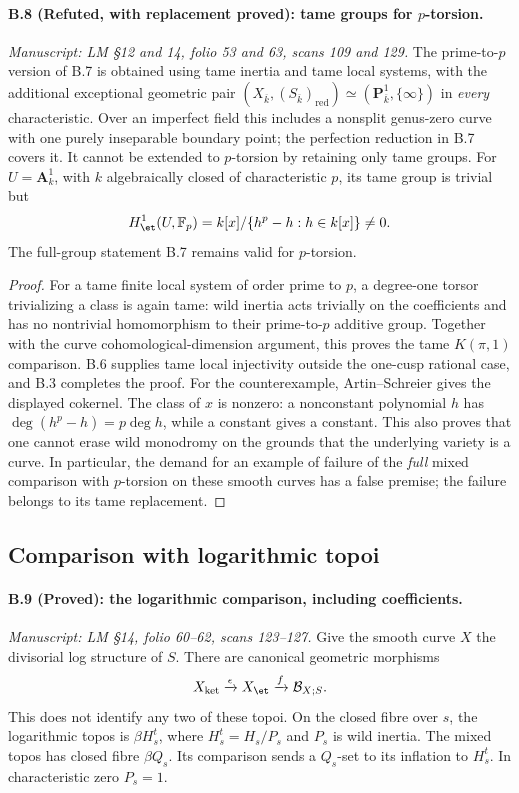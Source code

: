 \paragraph{B.8 (Refuted, with replacement proved): tame groups for $p$-torsion.}\label{B8}
\textit{Manuscript: LM \S12 and 14, folio 53 and 63, scans 109 and 129.}
The prime-to-$p$ version of B.7 is obtained using tame inertia
and tame local systems, with the additional exceptional geometric
pair $(X_{\overline k},(S_{\overline k})_{\mathrm{red}})
\simeq(\mathbf P^1_{\overline k},\{\infty\})$ in
\emph{every} characteristic. Over an imperfect field this includes
a nonsplit genus-zero curve with one purely inseparable boundary
point; the perfection reduction in B.7 covers it.
It cannot be extended to $p$-torsion by retaining only tame groups.
For $U=\mathbf A^1_k$, with $k$ algebraically closed of
characteristic $p$, its tame group is
trivial but
\[
 H^1_{\et}(U,\mathbb F_p)=k[x]/\{h^p-h:h\in k[x]\}\ne0.
\]
The full-group statement B.7 remains valid for $p$-torsion.

\begin{proof}
For a tame finite local system of order prime to $p$, a
degree-one torsor trivializing a class is again tame: wild
inertia acts trivially on the coefficients and has no nontrivial
homomorphism to their prime-to-$p$ additive group. Together with
the curve cohomological-dimension argument, this proves the
tame $K(\pi,1)$ comparison. B.6 supplies tame local injectivity
outside the one-cusp rational case, and B.3 completes the proof.
For the counterexample, Artin--Schreier gives the displayed
cokernel. The class of $x$ is nonzero: a nonconstant polynomial
$h$ has $\deg(h^p-h)=p\deg h$, while a constant gives a constant.
This also proves that one cannot erase wild monodromy on the
grounds that the underlying variety is a curve. In particular,
the demand for an example of failure of the \emph{full} mixed
comparison with $p$-torsion on these smooth curves has a false
premise; the failure belongs to its tame replacement.
\end{proof}

\subsection{Comparison with logarithmic topoi}

\paragraph{B.9 (Proved): the logarithmic comparison, including coefficients.}\label{B9}
\textit{Manuscript: LM \S14, folio 60--62, scans 123--127.}
Give the smooth curve $X$ the divisorial log structure of $S$.
There are canonical geometric morphisms
\[
 X_{\mathrm{ket}}\xrightarrow{\epsilon}X_{\et}
       \xrightarrow{f}\mathcal B_{X;S}.
\]
This does not identify any two of these topoi. On the closed
fibre over $s$, the logarithmic topos is $\beta H_s^t$, where
$H_s^t=H_s/P_s$ and $P_s$ is wild inertia. The mixed topos has
closed fibre $\beta Q_s$. Its comparison sends a $Q_s$-set to
its inflation to $H_s^t$. In characteristic zero $P_s=1$.

